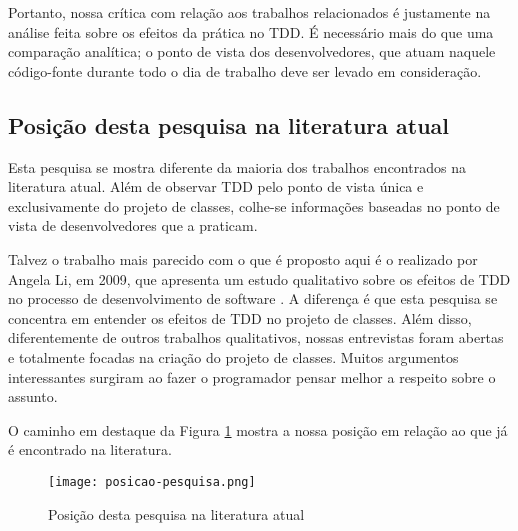 Portanto, nossa crítica
com relação aos trabalhos relacionados é justamente na análise feita sobre os
efeitos da prática no TDD. É necessário mais do que uma comparação analítica; o
ponto de vista dos desenvolvedores, que atuam naquele código-fonte durante todo
o dia de trabalho deve ser levado em consideração.

\subsection{Posição desta pesquisa na literatura atual}

Esta pesquisa se mostra diferente da maioria dos trabalhos encontrados na
literatura atual. Além de observar TDD pelo ponto de vista única e
exclusivamente do projeto de classes, colhe-se informações baseadas no ponto de
vista de desenvolvedores que a praticam.

Talvez o trabalho mais parecido com o que é proposto aqui é o
realizado por Angela Li, em 2009, que apresenta um estudo qualitativo sobre os
efeitos de TDD no processo de desenvolvimento de software \cite{angela-li}. 
A diferença é que esta pesquisa se concentra em entender os
efeitos de TDD no projeto de classes.
Além disso, diferentemente de outros trabalhos qualitativos, nossas entrevistas foram
abertas e totalmente focadas na criação do projeto de classes. Muitos argumentos interessantes
surgiram ao fazer o programador pensar melhor a respeito sobre o assunto.

O caminho em destaque da Figura \ref{fig:posicao-pesquisa} mostra a nossa posição
em relação ao que já é encontrado na literatura.

\begin{figure}[h!]
  \centering
  \texttt{[image: posicao-pesquisa.png]}
  \caption{Posição desta pesquisa na literatura atual}
  \label{fig:posicao-pesquisa}
\end{figure}

